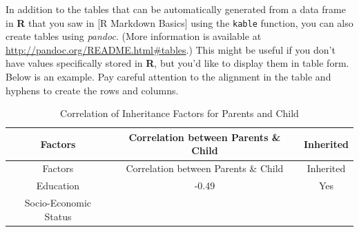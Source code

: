 \documentclass[12pt,twoside]{reedthesis}
\theoremstyle{definition}
\theoremstyle{definition}
\theoremstyle{definition}
\theoremstyle{remark}
\begin{document}
In addition to the tables that can be automatically generated from a
data frame in \textbf{R} that you saw in {[}R Markdown Basics{]} using
the \texttt{kable} function, you can also create tables using
\emph{pandoc}. (More information is available at
\url{http://pandoc.org/README.html\#tables}.) This might be useful if
you don't have values specifically stored in \textbf{R}, but you'd like
to display them in table form. Below is an example. Pay careful
attention to the alignment in the table and hyphens to create the rows
and columns.
\begin{longtable}[]{@{}ccc@{}}
\caption{\label{tab:inher} Correlation of Inheritance Factors for Parents
and Child}\tabularnewline
\toprule
\begin{minipage}[b]{0.29\columnwidth}\centering\strut
Factors\strut
\end{minipage} & \begin{minipage}[b]{0.47\columnwidth}\centering\strut
Correlation between Parents \& Child\strut
\end{minipage} & \begin{minipage}[b]{0.16\columnwidth}\centering\strut
Inherited\strut
\end{minipage}\tabularnewline
\midrule
\endfirsthead
\toprule
\begin{minipage}[b]{0.29\columnwidth}\centering\strut
Factors\strut
\end{minipage} & \begin{minipage}[b]{0.47\columnwidth}\centering\strut
Correlation between Parents \& Child\strut
\end{minipage} & \begin{minipage}[b]{0.16\columnwidth}\centering\strut
Inherited\strut
\end{minipage}\tabularnewline
\midrule
\endhead
\begin{minipage}[t]{0.29\columnwidth}\centering\strut
Education\strut
\end{minipage} & \begin{minipage}[t]{0.47\columnwidth}\centering\strut
-0.49\strut
\end{minipage} & \begin{minipage}[t]{0.16\columnwidth}\centering\strut
Yes\strut
\end{minipage}\tabularnewline
\begin{minipage}[t]{0.29\columnwidth}\centering\strut
Socio-Economic Status\strut
\end{minipage} & \begin{minipage}[t]{0.47\columnwidth}\centering\strut

\end{minipage}
\end{longtable}
\end{document}
